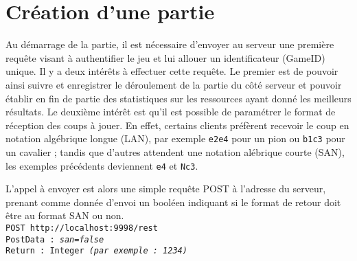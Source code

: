 \documentclass[a4paper,11pt]{report}
\begin{document}
\section{Création d’une partie}
        Au démarrage de la partie, il est nécessaire d’envoyer au serveur une première requête visant à authentifier le jeu et lui allouer un identificateur (GameID) unique. Il y a deux intérêts à effectuer cette requête. Le premier est de pouvoir ainsi suivre et enregistrer le déroulement de la partie du côté serveur et pouvoir établir en fin de partie des statistiques sur les ressources ayant donné les meilleurs résultats. Le deuxième intérêt est qu’il est possible de paramétrer le format de réception des coups à jouer. En effet, certains clients préfèrent recevoir le coup en notation algébrique longue (LAN), par exemple {\tt e2e4} pour un pion ou {\tt b1c3} pour un cavalier ; tandis que d’autres attendent une notation alébrique courte (SAN), les exemples précédents deviennent {\tt e4} et {\tt Nc3}.


        L’appel à envoyer est alors une simple requête POST à l’adresse du serveur, prenant comme donnée d’envoi un booléen indiquant si le format de retour doit être au format SAN ou non.
\\{\tt POST http://localhost:9998/rest\\
PostData : {\em san=false}\\
Return : Integer {\em (par exemple : 1234)} }\\
\end{document}
